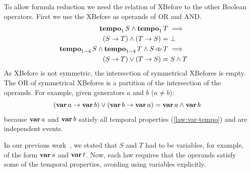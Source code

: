 \documentclass[12pt,openright,twoside,a4paper,oldfontcommands,english,brazil,final]{abntex2}
\theoremstyle{theo}
\def\varop{\ensuremath\operatorname{\mathbf{var}}}
\newcommand{\var}[1]{\ensuremath\varop #1}
\def\xbeforeop{\ensuremath\rightarrow}
\newcommand{\xbefore}[2]{\ensuremath #1 \xbeforeop #2 }
\def\tempoop{\ensuremath\operatorname{\mathbf{tempo}}}
\newcommand{\tempo}[2][1-4]{\ensuremath\tempoop_{#1} #2}
\def\independenteventsop{\ensuremath\operatorname{\triangleleft\triangleright}}
\newcommand{\independentevents}[2]{\ensuremath #1 \independenteventsop #2}
\newcommand{\parsin}[1]{\ensuremath\left( #1 \right)}
\begin{document}
To allow formula reduction we need the relation of \ac{XBefore} to the other Boolean operators.
First we use the \ac{XBefore} as operands of \ac{OR} and \ac{AND}.
%
\begin{subequations}
\begin{align}
\tempo[1]{S} \land \tempo[1]{T}&\implies\nonumber\\
  \parsin{\xbefore{S}{T}} \land \parsin{\xbefore{T}{S}} =&~
  \bot &
  \label{thm:xbefore-inf-equiv-bot}\\
%
\tempo{S} \land \tempo{T} \land \independentevents{S}{T}&\implies\nonumber\\
  \parsin{\xbefore{S}{T}} \lor \parsin{\xbefore{T}{S}} =&~
  S \land T &
  \label{thm:xbefore-sup-equiv-inf}
%
\end{align}
\end{subequations}
%
As \ac{XBefore} is not symmetric, the intersection of symmetrical \acp{XBefore} is empty.
The \ac{OR} of symmetrical \acp{XBefore} is a partition of the intersection of the operands.
For example, given generators $a$ and $b$ ($a \neq b$):
\begin{equation}
\left(\xbefore{\var{a}}{\var{b}}\right) \lor \left(\xbefore{\var{b}}{\var{a}}\right) = \var{a} \land \var{b}
\end{equation}
%
because $\var{a}$ and $\var{b}$ satisfy all temporal properties (\cref{law:var-tempo}) and are independent events.

In our previous work~\cite{DM2015}, we stated that $S$ and $T$ had to be variables, for example, of the form $\var{s}$ and $\var{t}$.
Now, each law requires that the operands satisfy some of the temporal properties, avoiding using variables explicitly.
\end{document}
